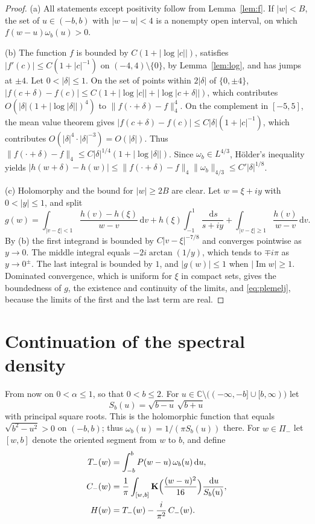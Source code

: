 \documentclass[11pt]{amsart}
\numberwithin{equation}{section}
\theoremstyle{definition}
\theoremstyle{remark}
\newcommand{\C}{\mathbb{C}}
\newcommand{\Pim}{\Pi_{-}}
\newcommand{\dd}{\,\mathrm{d}}
\DeclareMathOperator{\im}{Im}
\newcommand{\Kc}{\mathbf{K}}
\begin{document}
\begin{proof}
(a) All statements except positivity follow from Lemma~\ref{lem:f}. If
$|w|<B$, the set of $u\in(-b,b)$ with $|w-u|<4$ is a nonempty open interval,
on which $f(w-u)\omega_b(u)>0$.

(b) The function $f$ is bounded by $C(1+|\log|c||)$, satisfies
$|f'(c)|\le C(1+|c|^{-1})$ on $(-4,4)\setminus\{0\}$, by Lemma~\ref{lem:log},
and has jumps at $\pm4$. Let $0<|\delta|\le1$. On the set of points within
$2|\delta|$ of $\{0,\pm4\}$, $|f(c+\delta)-f(c)|\le
C(1+|\log|c||+|\log|c+\delta||)$, which contributes
$O(|\delta|(1+|\log|\delta||)^4)$ to $\|f(\cdot+\delta)-f\|_4^4$. On the
complement in $[-5,5]$, the mean value theorem gives
$|f(c+\delta)-f(c)|\le C|\delta|(1+|c|^{-1})$, which contributes
$O(|\delta|^4\cdot|\delta|^{-3})=O(|\delta|)$. Thus
$\|f(\cdot+\delta)-f\|_4\le C|\delta|^{1/4}(1+|\log|\delta||)$. Since
$\omega_b\in L^{4/3}$, H\"older's inequality yields
$|h(w+\delta)-h(w)|\le\|f(\cdot+\delta)-f\|_4\|\omega_b\|_{4/3}\le
C'|\delta|^{1/8}$.

(c) Holomorphy and the bound for $|w|\ge2B$ are clear. Let $w=\xi+iy$ with
$0<|y|\le1$, and split
\[
g(w)=\int_{|v-\xi |<1}\frac{h(v)-h(\xi)}{w-v}\dd v+h(\xi)\int_{-1}^{1}\frac{\dd s}{s+iy}
+\int_{|v-\xi |\ge1}\frac{h(v)}{w-v}\dd v .
\]
By (b) the first integrand is bounded by $C|v-\xi |^{-7/8}$ and converges
pointwise as $y\to0$. The middle integral equals $-2i\arctan(1/y)$, which
tends to $\mp i\pi$ as $y\to0^\pm$. The last integral is bounded by $1$, and $|g(w)|\le1$ when $|\im w|\ge1$.
Dominated convergence, which is uniform for $\xi$ in compact sets, gives the
boundedness of $g$, the existence and
continuity of the limits, and \eqref{eq:plemelj}, because the limits of the
first and the last term are real.
\end{proof}

\section{Continuation of the spectral density}\label{sec:continuation}

From now on $0<\alpha\le1$, so that $0<b\le2$. For $u\in\C\setminus\bigl((-\infty,-b]\cup[b,\infty)\bigr)$ let
\[
S_b(u)=\sqrt{b-u}\,\sqrt{b+u}
\]
with principal square roots. This is the holomorphic function that equals
$\sqrt{b^2-u^2}>0$ on $(-b,b)$; thus $\omega_b(u)=1/(\pi S_b(u))$ there. For
$w\in\Pim$ let $[w,b]$ denote the oriented segment from $w$ to $b$, and define
\begin{align}
T_-(w)&=\int_{-b}^{b}P(w-u)\,\omega_b(u)\dd u,\label{eq:Tminus}\\
C_-(w)&=\frac1\pi\int_{[w,b]}\Kc\Bigl(\frac{(w-u)^2}{16}\Bigr)\frac{\dd u}{S_b(u)},\label{eq:Cminus}\\
H(w)&=T_-(w)-\frac{i}{\pi^2}\,C_-(w).\label{eq:H}
\end{align}
\end{document}
